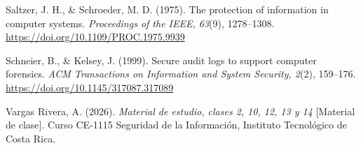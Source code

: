 \documentclass[11pt,letterpaper]{article}
\begin{document}
{Saltzer, J. H., \& Schroeder, M. D. (1975). The protection of information in computer systems.
\emph{Proceedings of the IEEE, 63}(9), 1278--1308. \url{https://doi.org/10.1109/PROC.1975.9939}

Schneier, B., \& Kelsey, J. (1999). Secure audit logs to support computer forensics. \emph{ACM
Transactions on Information and System Security, 2}(2), 159--176.
\url{https://doi.org/10.1145/317087.317089}

Vargas Rivera, A. (2026). \emph{Material de estudio, clases 2, 10, 12, 13 y 14} [Material de clase].
Curso CE-1115 Seguridad de la Información, Instituto Tecnológico de Costa Rica.

}
\end{document}

